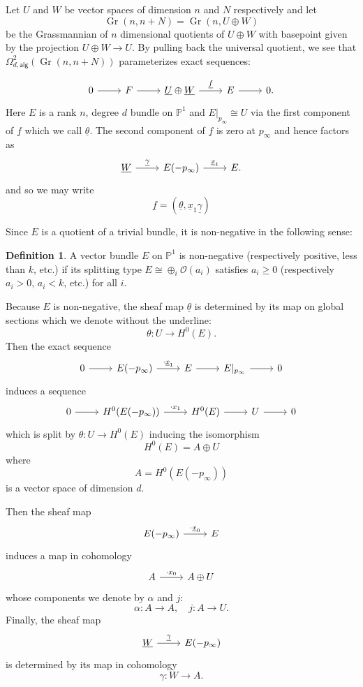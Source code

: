 \documentclass{amsart}
\theoremstyle{definition}
\newtheorem{definition}[theorem]{Definition}
\newcommand{\PP}{\mathbb{P}}
\newcommand{\OO}{\mathcal{O}}
\newcommand{\UL}[1]{\underline{#1}}
\newcommand{\alg}{\mathsf{alg}}
\newcommand{\Gr}{\operatorname{Gr}}
\newcommand{\LoopTwo}{\Omega^{2}_{d,\alg}}
\begin{document}
Let $U$ and $W$ be vector spaces of dimension $n$ and $N$ respectively
and let
\[
\Gr (n,n+N) = \Gr (n,U\oplus W)
\]
be the Grassmannian of $n$ dimensional quotients of $U\oplus W$ with
basepoint given by the projection $U\oplus W\to U$. By pulling back
the universal quotient, we see that $\LoopTwo (\Gr (n,n+N))$
parameterizes exact sequences:

\[
\begin{tikzcd}
0\arrow[r]& F \arrow[r]& \UL{U}\oplus \UL{W} \arrow{r}{\UL{f} } &E
\arrow[r]& 0.
\end{tikzcd}
\]
Here $E$ is a rank $n$, degree $d$ bundle on $\PP^{1}$ and
$E|_{p_{\infty}}\cong U$ via the first component of $\UL{f}$ which we
call $\UL{\theta}$. The second component of $\UL{f}$ is zero at
$p_{\infty}$ and hence factors as
\[
\begin{tikzcd}
 \UL{W} \arrow[r,"\UL{\gamma }"]& E(-p_{\infty})
 \arrow[r,"\UL{x}_{1}"] &E. 
\end{tikzcd}
\]
and so we may write
\[
\UL{f}
=({\UL{\theta}},\UL{x}_{1}\UL{\gamma })
\]



Since $E$ is a quotient of a trivial bundle, it is non-negative in the
following sense:
\begin{definition}
A vector bundle $E$ on $\PP^{1}$ is non-negative (respectively
positive, less than $k$, etc.) if its splitting type $E\cong
\oplus_{i}\OO (a_{i})$ satisfies $a_{i} \geq 0$ (respectively
$a_{i}>0$, $a_{i}<k$, etc.) for all $i$. 
\end{definition}


Because $E$ is non-negative, the sheaf map $\UL{\theta}$ is
determined by its map on global sections which we denote without the
underline:
\[
\theta:U \longrightarrow H^{0}(E).
\]
Then the exact sequence
\[
\begin{tikzcd}
0\arrow[r]&E(-p_{\infty})\arrow{r}{\cdot \UL{x}_{1}}
&E\arrow[r]&E|_{p_{\infty}} \arrow[r] &0
\end{tikzcd}
\]
induces a sequence
\[
\begin{tikzcd}
0\arrow[r]&H^{0}(E(-p_{\infty}))\arrow{r}{\cdot {x}_{1}}
&H^{0}(E)\arrow[r]&U \arrow[r] &0
\end{tikzcd}
\]
which is split by $\theta:U\to H^{0}(E)$ inducing the isomorphism
\[
H^{0}(E) = A\oplus U
\]
where 
\[
A=H^{0}(E(-p_{\infty}))
\]
is a vector space of dimension $d$.

Then the sheaf map
\[
\begin{tikzcd}
 E(-p_{\infty})\arrow{r}{\cdot \UL{x}_{0}} &E
\end{tikzcd}
\]
induces a map in cohomology
\[
\begin{tikzcd}
A\arrow{r}{\cdot x_{0}} &A\oplus U
\end{tikzcd}
\]
whose components we denote by $\alpha$ and $j$:
\[
\alpha :A\to A, \quad j: A\to U.
\]
Finally, the sheaf map
\[
\begin{tikzcd}
\UL{W}\arrow{r}{\UL{\gamma}} & E(-p_{\infty})
\end{tikzcd}
\]
is determined by its map in cohomology
\[
\gamma :W\to A.
\]
\end{document}
